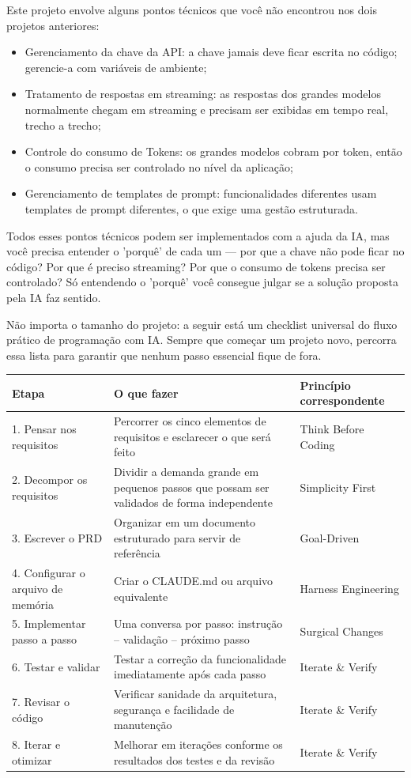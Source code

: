 
Este projeto envolve alguns pontos técnicos que você não encontrou nos dois projetos anteriores:

\begin{itemize}
  \item Gerenciamento da chave da API: a chave jamais deve ficar escrita no código; gerencie-a com variáveis de ambiente;
  \item Tratamento de respostas em streaming: as respostas dos grandes modelos normalmente chegam em streaming e precisam ser exibidas em tempo real, trecho a trecho;
  \item Controle do consumo de Tokens: os grandes modelos cobram por token, então o consumo precisa ser controlado no nível da aplicação;
  \item Gerenciamento de templates de prompt: funcionalidades diferentes usam templates de prompt diferentes, o que exige uma gestão estruturada.
\end{itemize}

Todos esses pontos técnicos podem ser implementados com a ajuda da IA, mas você precisa entender o 'porquê' de cada um — por que a chave não pode ficar no código? Por que é preciso streaming? Por que o consumo de tokens precisa ser controlado? Só entendendo o 'porquê' você consegue julgar se a solução proposta pela IA faz sentido.


Não importa o tamanho do projeto: a seguir está um checklist universal do fluxo prático de programação com IA. Sempre que começar um projeto novo, percorra essa lista para garantir que nenhum passo essencial fique de fora.

\begin{center}
\begin{tabularx}{\linewidth}{|X|X|X|}
\hline
\textbf{Etapa} & \textbf{O que fazer} & \textbf{Princípio correspondente} \tabularnewline
\hline
1. Pensar nos requisitos & Percorrer os cinco elementos de requisitos e esclarecer o que será feito & Think Before Coding \tabularnewline
2. Decompor os requisitos & Dividir a demanda grande em pequenos passos que possam ser validados de forma independente & Simplicity First \tabularnewline
3. Escrever o PRD & Organizar em um documento estruturado para servir de referência & Goal-Driven \tabularnewline
4. Configurar o arquivo de memória & Criar o CLAUDE.md ou arquivo equivalente & Harness Engineering \tabularnewline
5. Implementar passo a passo & Uma conversa por passo: instrução – validação – próximo passo & Surgical Changes \tabularnewline
6. Testar e validar & Testar a correção da funcionalidade imediatamente após cada passo & Iterate \& Verify \tabularnewline
7. Revisar o código & Verificar sanidade da arquitetura, segurança e facilidade de manutenção & Iterate \& Verify \tabularnewline
8. Iterar e otimizar & Melhorar em iterações conforme os resultados dos testes e da revisão & Iterate \& Verify \tabularnewline
\hline
\end{tabularx}
\end{center}

